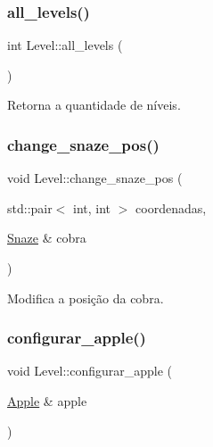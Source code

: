 \mbox{\label{classLevel_a27555723585164ed6258be2320e83458}} 
\subsubsection{\texorpdfstring{all\+\_\+levels()}{all\_levels()}}
{\footnotesize\ttfamily int Level\+::all\+\_\+levels (\begin{DoxyParamCaption}{ }\end{DoxyParamCaption})\hspace{0.3cm}{\ttfamily [inline]}}



Retorna a quantidade de níveis. 

\mbox{\label{classLevel_ac42ca0b4e7c6c493ddaa00ed06fb2e3f}} 
\subsubsection{\texorpdfstring{change\+\_\+snaze\+\_\+pos()}{change\_snaze\_pos()}}
{\footnotesize\ttfamily void Level\+::change\+\_\+snaze\+\_\+pos (\begin{DoxyParamCaption}\item[{std\+::pair$<$ int, int $>$}]{coordenadas,  }\item[{\hyperlink{classSnaze}{Snaze} \&}]{cobra }\end{DoxyParamCaption})\hspace{0.3cm}{\ttfamily [inline]}}



Modifica a posição da cobra. 

\mbox{\label{classLevel_a19bfdf725454de061d80cc23a370677d}} 
\subsubsection{\texorpdfstring{configurar\+\_\+apple()}{configurar\_apple()}}
{\footnotesize\ttfamily void Level\+::configurar\+\_\+apple (\begin{DoxyParamCaption}\item[{\hyperlink{classApple}{Apple} \&}]{apple }\end{DoxyParamCaption})\hspace{0.3cm}{\ttfamily [inline]}}



